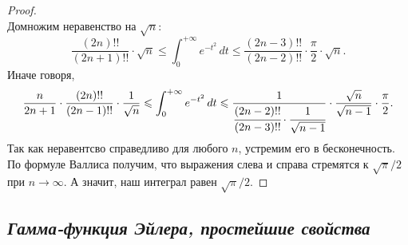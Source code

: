 \begin{proof}
\[	\]
	Домножим неравенство на \(\sqrt{n}\): \[
	\frac{(2n)!!}{(2n + 1)!!} \cdot \sqrt{n} \leqslant \int_0^{+\infty} e^{-t^2} \, dt \leqslant \frac{(2n - 3)!!}{(2n - 2)!!} \cdot \frac{\pi}{2} \cdot \sqrt{n}.
	\]
	Иначе говоря, \[
	\frac{n}{2n + 1} \cdot \frac{(2n)!!}{(2n - 1)!!} \cdot \frac{1}{\sqrt{n}} \leqslant \int_0^{+\infty} e^{-t^2} \, dt \leqslant \frac{1}{\cfrac{(2n - 2)!!}{(2n - 3)!!} \cdot \cfrac{1}{\sqrt{n - 1}}} \cdot \frac{\sqrt{n}}{\sqrt{n - 1}}\cdot \frac{\pi}{2}.
	\]
	Так как неравентсво справедливо для любого \(n\), устремим его в бесконечность. По \hypertarget{wall}{формуле Валлиса} получим, что выражения слева и справа стремятся к \(\sqrt{\pi}/{2}\) при \(n \to \infty\). А значит, наш интеграл равен \(\sqrt{\pi}/{2}\).
\end{proof}

\subsection{\color{red} \itshape Гамма-функция Эйлера, простейшие свойства}

